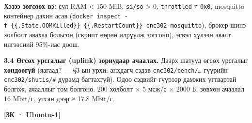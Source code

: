 \begin{longtable}[]{@{}lllllllllll@{}}
\begin{minipage}[t]{0.07\columnwidth}
\strut
\end{minipage} & \begin{minipage}[t]{0.07\columnwidth}\raggedright
\strut
\end{minipage} & \begin{minipage}[t]{0.07\columnwidth}\raggedright
\strut
\end{minipage} & \begin{minipage}[t]{0.07\columnwidth}\raggedright
\strut
\end{minipage} & \begin{minipage}[t]{0.07\columnwidth}\raggedright
\strut
\end{minipage} & \begin{minipage}[t]{0.07\columnwidth}\raggedright
\strut
\end{minipage} & \begin{minipage}[t]{0.07\columnwidth}\raggedright
\strut
\end{minipage} & \begin{minipage}[t]{0.07\columnwidth}\raggedright
\strut
\end{minipage} & \begin{minipage}[t]{0.07\columnwidth}\raggedright
\strut
\end{minipage}\tabularnewline
\bottomrule
\end{longtable}\endgroup

\textbf{Хэзээ зогсоох вэ:} сул RAM \textless{} 150 MiB, \texttt{si/so} \textgreater{} 0, \texttt{throttled} ≠ \texttt{0x0}, mosquitto контейнер дахин асав (\texttt{docker\ inspect\ -f\ \textquotesingle{}\{\{.State.OOMKilled\}\}\ \{\{.RestartCount\}\}\textquotesingle{}\ cnc302-mosquitto}), брокер шинэ холболт авахаа больсон (скрипт өөрөө илрүүлж зогсоно), эсвэл хүлээн авалт илгээсний 95\%-иас доош.

\textbf{3.4 Өгсөх урсгалыг (uplink) зориудаар ачаалах.} Дээрх шатууд өгсөх урсгалыг \textbf{хөндөөгүй} (яагаад? --- §3-ын урхи: анхдагч сэдэв \texttt{cnc302/\allowbreak{}bench/\allowbreak{}\ldots{}} гүүрийн \texttt{cnc302/shutis/\#} дүрэмд багтахгүй). Одоо сэдвийг гүүрээр дамжих угтвартай болгож, ачааллыг том болгоно. 200 холболт × 5 мсж/с × 2000 Б: зөвхөн ачаалал 16 Mbit/с, утсан дээр ≈ 17.8 Mbit/с.

\textbf{{[}ЗК · Ubuntu-1{]}}

\begin{Shaded}
\begin{Highlighting}[]
 \KeywordTok{\textbackslash{}}
  \OperatorTok{\textless{}}\OperatorTok{\textgreater{}}
\end{Highlighting}
\end{Shaded}


